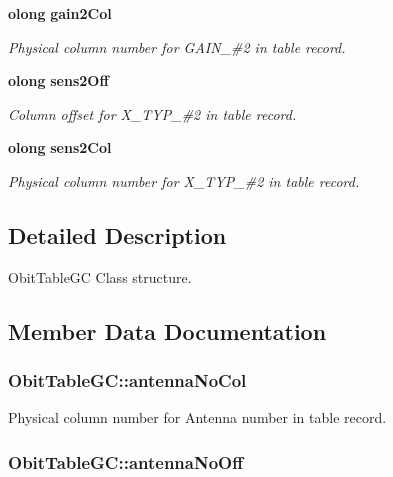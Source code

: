 \begin{CompactItemize}
{\bf olong} {\bf gain2Col}
\begin{CompactList}\small\item\em Physical column number for GAIN\_\-\#2 in table record. \item\end{CompactList}\item 
{\bf olong} {\bf sens2Off}
\begin{CompactList}\small\item\em Column offset for X\_\-TYP\_\-\#2 in table record. \item\end{CompactList}\item 
{\bf olong} {\bf sens2Col}
\begin{CompactList}\small\item\em Physical column number for X\_\-TYP\_\-\#2 in table record. \item\end{CompactList}\end{CompactItemize}


\subsection{Detailed Description}
Obit\-Table\-GC Class structure. 



\subsection{Member Data Documentation}
\subsubsection{ {\bf Obit\-Table\-GC::antenna\-No\-Col}}\label{structObitTableGC_o20}


Physical column number for Antenna number in table record. 

\subsubsection{ {\bf Obit\-Table\-GC::antenna\-No\-Off}}\label{structObitTableGC_o19}


